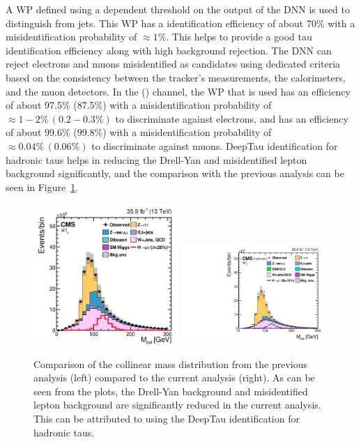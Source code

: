 A WP defined using a \pt dependent threshold on the output of the DNN is used to distinguish \tauh from jets. This WP has a \tauh identification efficiency of about 70\% with a misidentification probability of $\approx 1\%$. This helps to provide a good tau identification efficiency along with high background rejection. The DNN can reject electrons and muons misidentified as \tauh candidates using dedicated criteria based on the consistency between the tracker's measurements, the calorimeters, and the muon detectors. In the \muhad (\ehad) channel, the WP that is used has an efficiency of about 97.5\% (87.5\%) with a misidentification probability of $\approx 1-2\% \, (0.2-0.3\%)$ to discriminate \tauh against electrons, and has an efficiency of about 99.6\% (99.8\%) with a misidentification probability of $\approx 0.04\% \, (0.06\%)$ to discriminate \tauh against muons. DeepTau identification for hadronic taus helps in reducing the Drell-Yan and misidentified lepton background significantly, and the comparison with the previous analysis can be seen in Figure~\ref{fig:collmass}.

\begin{figure}[hbtp]
  \centering
  \includegraphics[width=0.49\textwidth]{plots/chapter5/CollMass2016.png}
  \includegraphics[width=0.49\textwidth]{plots/chapter5/CollMassRun2.pdf}
  \caption{Comparison of the collinear mass distribution from the previous analysis (left) compared to the current analysis (right). As can be seen from the plots, the Drell-Yan background and misidentified lepton background are significantly reduced in the current analysis. This can be attributed to using the DeepTau identification for hadronic taus.}
  \label{fig:collmass}
\end{figure}


